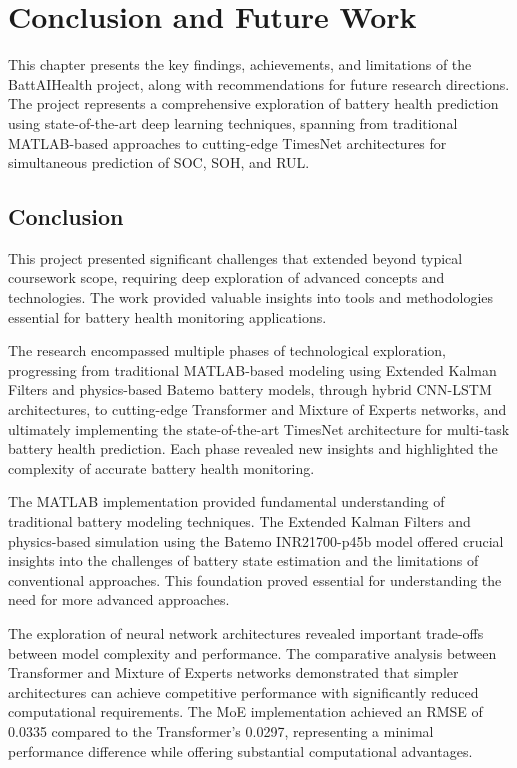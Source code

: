 \chapter{Conclusion and Future Work}
\label{sec:conclusion_future_work}

This chapter presents the key findings, achievements, and limitations of the BattAIHealth project, along with recommendations for future research directions. The project represents a comprehensive exploration of battery health prediction using state-of-the-art deep learning techniques, spanning from traditional MATLAB-based approaches to cutting-edge TimesNet architectures for simultaneous prediction of SOC, SOH, and RUL.

\section{Conclusion}
\label{sec:conclusion}

This project presented significant challenges that extended beyond typical coursework scope, requiring deep exploration of advanced concepts and technologies. The work provided valuable insights into tools and methodologies essential for battery health monitoring applications.

The research encompassed multiple phases of technological exploration, progressing from traditional MATLAB-based modeling using Extended Kalman Filters and physics-based Batemo battery models, through hybrid CNN-LSTM architectures, to cutting-edge Transformer and Mixture of Experts networks, and ultimately implementing the state-of-the-art TimesNet architecture for multi-task battery health prediction. Each phase revealed new insights and highlighted the complexity of accurate battery health monitoring.

The MATLAB implementation provided fundamental understanding of traditional battery modeling techniques. The Extended Kalman Filters and physics-based simulation using the Batemo INR21700-p45b model offered crucial insights into the challenges of battery state estimation and the limitations of conventional approaches. This foundation proved essential for understanding the need for more advanced approaches.

The exploration of neural network architectures revealed important trade-offs between model complexity and performance. The comparative analysis between Transformer and Mixture of Experts networks demonstrated that simpler architectures can achieve competitive performance with significantly reduced computational requirements. The MoE implementation achieved an RMSE of 0.0335 compared to the Transformer's 0.0297, representing a minimal performance difference while offering substantial computational advantages.

